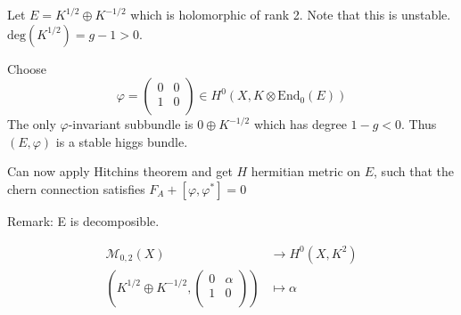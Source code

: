 Let $ E = K^{1/2} \oplus K^{-1/2}$ which is holomorphic of rank 2. 
Note that this is unstable.
$ \mathrm{deg} ( K^{1/2} ) = g -1  > 0 $. 

Choose 
\begin{equation}
    \varphi = \left(\begin{array}{rr}
        0 & 0 \\
        1 & 0 \\
    \end{array} \right) \in H^0 ( X, K \otimes \mathrm{End}_ 0 ( E))
\end{equation}
The only $ \varphi$-invariant subbundle is $ 0 \oplus K^{-1/2} $ 
which has degree $ 1-g < 0 $. 
Thus $ ( E, \varphi ) $ is a stable higgs bundle. 

Can now apply Hitchins theorem and get $ H$ hermitian metric on $E$, 
such that the chern connection satisfies $F_A + [\varphi, \varphi^* ] = 0 $ 

Remark: 
E is decomposible. 

\begin{align}
    \mathcal{M} _ {0,2} ( X) & \rightarrow H^0 (X, K ^2) \\
    \left( K ^{1/2} \oplus K^{-1/2} , \left(\begin{array}{rr}
        0 & \alpha \\
        1 & 0 \\ 
    \end{array} \right) \right) &  \mapsto \alpha 
\end{align}










 

